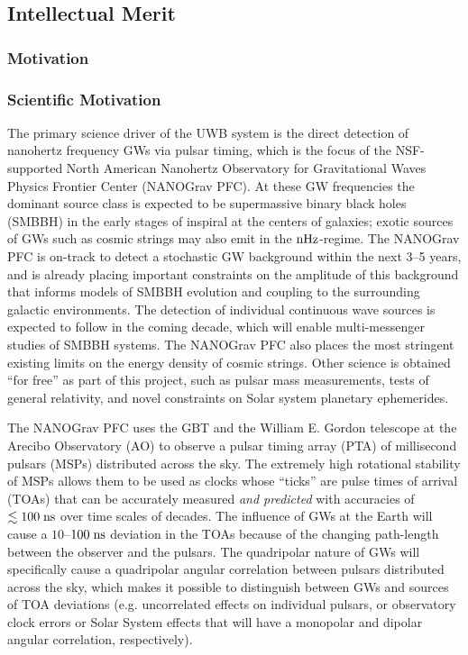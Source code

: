\documentclass[10pt]{NSF}
\begin{document}
\subsection{Intellectual Merit}
\label{sec:IM}

\subsubsection{Motivation}
\label{sec:motivation}

\subsubsection{Scientific Motivation}
\label{sec:science_motivation}

 The primary science driver
of the UWB system is the direct detection of nanohertz frequency GWs
via pulsar timing, which is the focus of the NSF-supported North
American Nanohertz Observatory for Gravitational Waves Physics
Frontier Center (NANOGrav PFC).  At these GW frequencies the dominant
source class is expected to be supermassive binary black holes (SMBBH)
in the early stages of inspiral at the centers of galaxies; exotic
sources of GWs such as cosmic strings may also emit in the
$\textrm{nHz}$-regime.  The NANOGrav PFC is on-track to detect a stochastic GW
background within the next 3--5 years, and is already placing
important constraints on the amplitude of this background that informs
models of SMBBH evolution and coupling to the surrounding galactic
environments.  The detection of individual continuous wave sources is
expected to follow in the coming decade, which will enable
multi-messenger studies of SMBBH systems.  The NANOGrav PFC also
places the most stringent existing limits on the energy density of
cosmic strings.  Other science is obtained ``for free'' as part of
this project, such as pulsar mass measurements, tests of general
relativity, and novel constraints on Solar system planetary
ephemerides.

The NANOGrav PFC uses the GBT and the William E. Gordon telescope at
the Arecibo Observatory (AO) to observe a pulsar timing array (PTA) of
millisecond pulsars (MSPs) distributed across the sky.  The extremely
high rotational stability of MSPs allows them to be used as clocks
whose ``ticks'' are pulse times of arrival (TOAs) that can be
accurately measured \emph{and predicted} with accuracies of
$\lesssim 100\; \textrm{ns}$ over time scales of decades.  The influence of
GWs at the Earth will cause a $10$--$100\; \textrm{ns}$ deviation in the TOAs
because of the changing path-length between the observer and the
pulsars.  The quadripolar nature of GWs will specifically cause a
quadripolar angular correlation between pulsars distributed across the
sky, which makes it possible to distinguish between GWs and sources of
TOA deviations (e.g. uncorrelated effects on individual pulsars, or
observatory clock errors or Solar System effects that will have a
monopolar and dipolar angular correlation, respectively).
\end{document}
